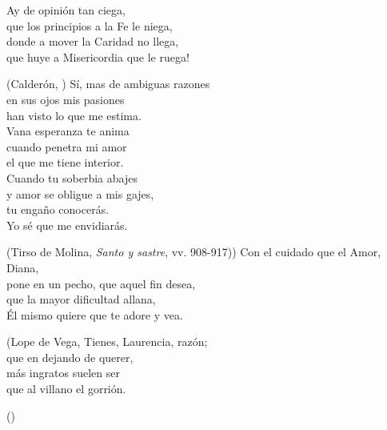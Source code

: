 \begin{exe}
	\ex\label{ex:continua}Ay de opinión tan ciega,\\
	que los principios a la Fe le niega,\\
	donde a mover la Caridad no llega,\\
	que huye a Misericordia que le ruega!\\
	\strut\hfill(Calderón, )
	\ex\label{ex:gemela}Sí, mas de ambiguas razones\\
	en sus ojos mis pasiones\vspace{.333\baselineskip}\\
	han visto lo que me estima.\\
	Vana esperanza te anima\vspace{.333\baselineskip}\\
	cuando penetra mi amor\\
	el que me tiene interior.\vspace{.333\baselineskip}\\
	Cuando tu soberbia abajes\\
	y amor se obligue a mis gajes,\vspace{.333\baselineskip}\\
	tu engaño conocerás.\\
	Yo sé que me envidiarás.\\
	\strut\hfill(Tirso de Molina, \textit{Santo y sastre}, vv. 908-917)\nocite{tirso_santoysastre})
	\ex\label{ex:encadenada} Con el cuidado que el Amor, Diana,\\
	pone en un pecho, que aquel fin desea,\\
	que la mayor dificultad allana,\\
	Él mismo quiere que te adore y vea.\\
	\strut\hfill(Lope de Vega, 
	\ex\label{ex:abrazada}Tienes, Laurencia, razón;\\
	que en dejando de querer,\\
	más ingratos suelen ser\\
	que al villano el gorrión.\\ 
	\strut\hfill()
\end{exe}


